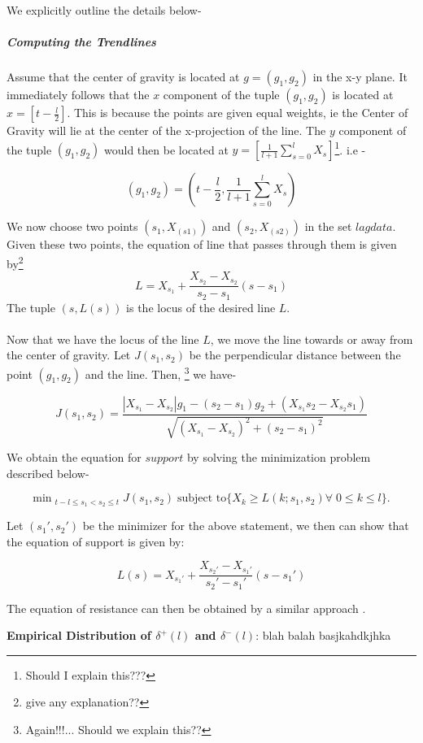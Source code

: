 \documentclass[letterpaper, 12pt] {article}
\let\oldmarginpar\marginpar
\renewcommand\marginpar[1]{\-\oldmarginpar[\raggedleft\footnotesize #1]%
	{\raggedright\footnotesize #1}}
\begin{document}
	We explicitly outline the details below- \pagebreak
	
	\subparagraph{Computing the Trendlines}
	Assume that the center of gravity is located at $g = (g_1, g_2)$ in the x-y plane. It immediately follows that the $x$ component of the tuple $(g_1, g_2)$ is located at $x = [t - \frac{l}{2}]$. This is because the points are given equal weights, ie the Center of Gravity will lie at the center of the x-projection of the line. The $y$ component of the tuple $(g_1, g_2)$ would then be located at $y = [\frac{1}{l+1}\sum_{s=0}^{l} X_s ]$\footnote{Should I explain this???}. i.e -
	
	\begin{equation*}
	(g_1, g_2) = (t - \frac{l}{2}, \frac{1}{l+1}\sum_{s=0}^{l} X_s )
	\end{equation*}
	
	We now choose two points $(s_1, X_(s1))$ and $(s_2, X_(s2))$ in the set $lagdata$. Given these two points, the equation of line that passes through them is given by\footnote{give any explanation??} 
	$$L = X_{s_1} + \frac{X_{s_2} - X_{s_2}}{s_2 - s_1}(s - s_1)$$ 
	The tuple $(s, L(s))$ is the locus of the desired line $L$. 
	
	\paragraph{}
	Now that we have the locus of the line $L$, we move the line towards or away from the center of gravity. Let $J(s_1, s_2)$ be the perpendicular distance between the point $(g_1, g_2)$ and the line. Then, \footnote{\label{note9}Again!!!... Should we explain this??} we have-
	
	\begin{equation*}
	J(s_1, s_2) = \frac{|X_{s_1} - X_{s_2}|g_1- (s_2-s_1)g_2 +(X_{s_1}s_2 - X_{s_2}s_1)}{\sqrt{(X_{s_1} - X_{s_2})^2 + (s_2 - s_1)^2}}
	\end{equation*}
	
	We obtain the equation for $support$ by solving the minimization problem described below-
	
	\begin{equation*}
	\text{min}\;_{{t-l}\leq {s_1} < {s_2} \leq t} \; J(s_1, s_2) \; \text{subject to} \{X_k \geq L(k; s_1, s_2) \forall \; 0 \leq k \leq l\}. 
	\end{equation*}
	
	Let $(s_1', s_2')$ be the minimizer for the above statement, we then can show that the equation of support is given by:
	
	\begin{equation*}
		L(s) = X_{s_1'} + \frac{X_{s_2'}-X_{s_1'}}{s_2' - s_1'} (s-s_1')
	\end{equation*}
	
	The equation of resistance can then be obtained by a similar approach \marginpar{refer to footnote 9}.
	\linebreak
	
	\textbf{Empirical Distribution of $\delta^+(l)$ and $\delta^-(l)$}: blah balah basjkahdkjhka
	 	
	
\end{document}
